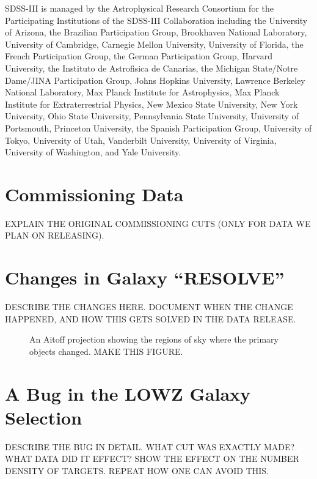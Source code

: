\documentclass[preprint]{aastex}
\begin{document}
SDSS-III is managed by the Astrophysical Research Consortium for the
Participating Institutions of the SDSS-III Collaboration including the
University of Arizona,
the Brazilian Participation Group,
Brookhaven National Laboratory,
University of Cambridge,
Carnegie Mellon University,
University of Florida,
the French Participation Group,
the German Participation Group,
Harvard University,
the Instituto de Astrofisica de Canarias,
the Michigan State/Notre Dame/JINA Participation Group,
Johns Hopkins University,
Lawrence Berkeley National Laboratory,
Max Planck Institute for Astrophysics,
Max Planck Institute for Extraterrestrial Physics,
New Mexico State University,
New York University,
Ohio State University,
Pennsylvania State University,
University of Portsmouth,
Princeton University,
the Spanish Participation Group,
University of Tokyo,
University of Utah,
Vanderbilt University,
University of Virginia,
University of Washington,
and Yale University.

\appendix

\section{Commissioning Data}
\label{app:comm}

EXPLAIN THE ORIGINAL COMMISSIONING CUTS (ONLY FOR DATA WE PLAN ON RELEASING). 


\section{Changes in Galaxy ``RESOLVE''}
\label{app:resolve}

DESCRIBE THE CHANGES HERE. DOCUMENT WHEN THE CHANGE HAPPENED, AND HOW THIS 
GETS SOLVED IN THE DATA RELEASE.

\begin{figure}
\caption{An Aitoff projection showing the regions of sky where the primary
objects changed. MAKE THIS FIGURE.}
\end{figure}

\section{A Bug in the LOWZ Galaxy Selection}
\label{app:lowzbug}

DESCRIBE THE BUG IN DETAIL. WHAT CUT WAS EXACTLY MADE? WHAT DATA DID IT EFFECT?
SHOW THE EFFECT ON THE NUMBER DENSITY OF TARGETS. REPEAT HOW ONE CAN AVOID THIS.
\end{document}
